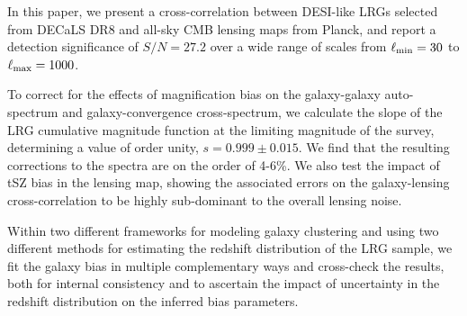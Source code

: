 In this paper, we present a cross-correlation between DESI-like LRGs selected from DECaLS DR8 and all-sky CMB lensing maps from Planck, and report a detection significance of $S/N = 27.2$ over a wide range of scales from $\ell_{\rm min} = 30$ to $\ell_{\rm max} = 1000$. 

To correct for the effects of magnification bias on the galaxy-galaxy auto-spectrum and galaxy-convergence cross-spectrum, we calculate the slope of the LRG cumulative magnitude function at the limiting magnitude of the survey, determining a value of order unity, $s = 0.999 \pm 0.015$. We find that the resulting corrections to the spectra are on the order of 4-6\%. We also test the impact of tSZ bias in the lensing map, showing the associated errors on the galaxy-lensing cross-correlation to be highly sub-dominant to the overall lensing noise.

Within two different frameworks for modeling galaxy clustering and using two different methods for estimating the redshift distribution of the LRG sample, we fit the galaxy bias in multiple complementary ways and cross-check the results, both for internal consistency and to ascertain the impact of uncertainty in the redshift distribution on the inferred bias parameters.

